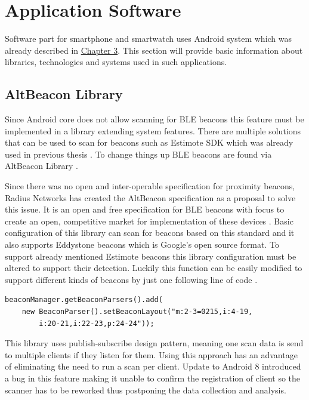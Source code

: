 \section{Application Software}\label{sec:ApplicationSoftware}
Software part for smartphone and smartwatch uses Android system which was already described in \hyperref[sec:WearOS]{Chapter 3}. This section will provide basic information about libraries, technologies and systems used in such applications.

\subsection{AltBeacon Library}\label{subsec:AltBeaconLibrary}
Since Android core does not allow scanning for BLE beacons this feature must be implemented in a library extending system features. There are multiple solutions that can be used to scan for beacons such as Estimote SDK \cite{ESDKfA} which was already used in previous thesis \cite{PMRIL}. To change things up BLE beacons are found via AltBeacon Library \cite{ABL}.

Since there was no open and inter-operable specification for proximity beacons, Radius Networks has created the AltBeacon specification as a proposal to solve this issue. It is an open and free specification for BLE beacons with focus to create an open, competitive market for implementation of these devices \cite{AltB}. Basic configuration of this library can scan for beacons based on this standard and it also supports Eddystone beacons which is Google's open source format. To support already mentioned Estimote beacons this library configuration must be altered to support their detection. Luckily this function can be easily modified to support different kinds of beacons by just one following line of code \cite{ABL, EDDF}.

\begin{lstlisting}[caption=Code to enable all beacon types]
beaconManager.getBeaconParsers().add(
	new BeaconParser().setBeaconLayout("m:2-3=0215,i:4-19,
		i:20-21,i:22-23,p:24-24"));
\end{lstlisting}

This library uses publish-subscribe design pattern, meaning one scan data is send to multiple clients if they listen for them. Using this approach has an advantage of eliminating the need to run a scan per client. Update to Android 8 introduced a bug in this feature making it unable to confirm the registration of client so the scanner has to be reworked thus postponing the data collection and analysis.

